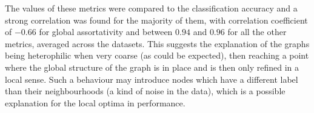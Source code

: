 The values of these metrics were compared to the classification accuracy and a strong correlation was found for the majority of them, with correlation coefficient of \( -0.66 \) for global assortativity and between \( 0.94 \) and \( 0.96 \) for all the other metrics, averaged across the datasets. This suggests the explanation of the graphs being heterophilic when very coarse (as could be expected), then reaching a point where the global structure of the graph is in place and is then only refined in a local sense. Such a behaviour may introduce nodes which have a different label than their neighbourhoods (a kind of noise in the data), which is a possible explanation for the local optima in performance.
